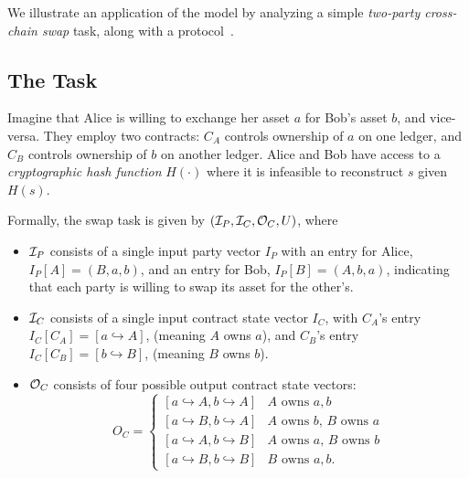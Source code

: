 We illustrate an application of the model by analyzing a simple
\emph{two-party cross-chain swap} task,
along with a protocol~\cite{tiersnolan}.

\subsection{The Task}
Imagine that Alice is willing to exchange her asset $a$
for Bob's asset $b$, and vice-versa.
They employ two contracts:
$C_A$ controls ownership of $a$ on one ledger,
and $C_B$ controls ownership of $b$ on another ledger.
Alice and Bob have access to a \emph{cryptographic hash function}
$H(\cdot)$ where it is infeasible to reconstruct $s$ given $H(s)$.

Formally, the swap task is given by $({\mathcal I}_P,{\mathcal I}_C,{\mathcal O}_C, U)$, where
\begin{itemize}
\item
  ${\mathcal I}_P$ consists of a single input party vector $I_P$
  with an entry for Alice, $I_P[A] = (B,a,b)$,
  and an entry for Bob, $I_P[B] = (A,b,a)$,
  indicating that each party is willing to swap its asset for the other's.

\item
  ${\mathcal I}_C$ consists of a single input contract state vector $I_C$, with
  $C_A$'s entry $I_C[C_A] = [a \hookrightarrow A]$, (meaning $A$ owns $a$), and
  $C_B$'s entry $I_C[C_B] = [b \hookrightarrow B]$, (meaning $B$ owns $b$).

\item
  ${\mathcal O}_C$ consists of four possible output contract state vectors:
  \begin{equation*}
    O_C = \begin{cases}
    [a \hookrightarrow A, b \hookrightarrow A]&\text{$A$ owns $a,b$}\\
    [a \hookrightarrow B, b \hookrightarrow A]&\text{$A$ owns $b$, $B$ owns $a$}\\
    [a \hookrightarrow A, b \hookrightarrow B]&\text{$A$ owns $a$, $B$ owns $b$}\\
    [a \hookrightarrow B, b \hookrightarrow B]&\text{$B$ owns $a,b$}.
  \end{cases}
  \end{equation*}
 

\end{itemize}
